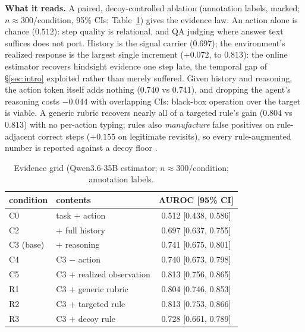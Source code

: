 \documentclass{article}
\begin{document}
\textbf{What it reads.} A paired, decoy-controlled ablation (annotation labels, marked; $n\approx300$/condition, 95\% CIs; Table~\ref{tab:grid}) gives
the evidence law. An action alone is chance ($0.512$): step quality is
relational, and QA judging where answer text suffices does not port. History
is the signal carrier ($0.697$); the environment's realized response is the
largest single increment ($+0.072$, to $0.813$): the online estimator
recovers hindsight evidence one step late, the temporal gap of
\S\ref{sec:intro} exploited rather than merely suffered. Given history and
reasoning, the action token itself adds nothing ($0.740$ vs $0.741$), and
dropping the agent's reasoning costs $-0.044$ with overlapping CIs: black-box operation over the target is viable. A generic rubric recovers
nearly all of a targeted rule's gain ($0.804$ vs $0.813$) with no per-action
typing; rules also \emph{manufacture} false positives on rule-adjacent correct
steps ($+0.155$ on legitimate revisits), so every rule-augmented number is
reported against a decoy floor \citep{zheng2023judging,zhang2026glean}.

\begin{table}[t]\centering\small
\caption{Evidence grid (Qwen3.6-35B estimator; $n\approx300$/condition;
annotation labels.}
\label{tab:grid}
\begin{tabular}{llc}
\toprule
condition & contents & AUROC [95\% CI] \\
\midrule
C0 & task $+$ action & 0.512 [0.438, 0.586] \\
C2 & $+$ full history & 0.697 [0.637, 0.755] \\
C3 (base) & $+$ reasoning & 0.741 [0.675, 0.801] \\
C4 & C3 $-$ action & 0.740 [0.673, 0.798] \\
C5 & C3 $+$ realized observation & 0.813 [0.756, 0.865] \\
R1 & C3 $+$ generic rubric & 0.804 [0.746, 0.853] \\
R2 & C3 $+$ targeted rule & 0.813 [0.753, 0.866] \\
R3 & C3 $+$ decoy rule & 0.728 [0.661, 0.789] \\
\bottomrule
\end{tabular}
\end{table}
\end{document}
